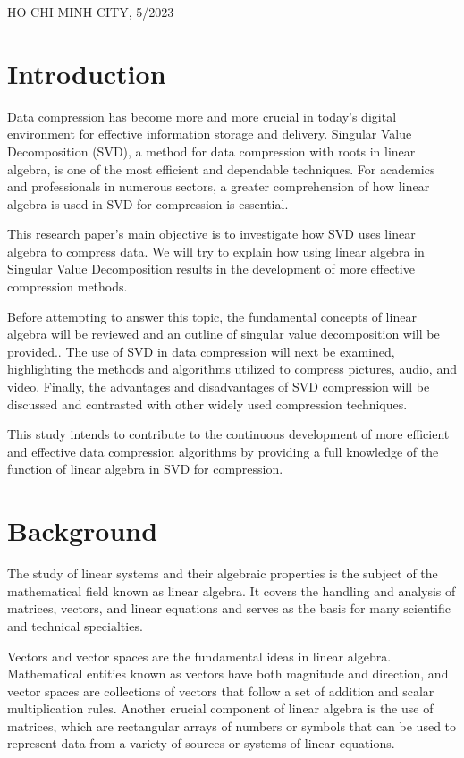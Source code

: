\documentclass[a4paper]{article}
\begin{document}
{\begin{titlepage}
			\begin{center}
				{\footnotesize HO CHI MINH CITY, 5/2023}
			\end{center}
		\end{titlepage}
		
		
		
		
		\newpage
		\tableofcontents
		\newpage
		\section{Introduction} 
		Data compression has become more and more crucial in today's digital environment for effective information storage and delivery. Singular Value Decomposition (SVD), a method for data compression with roots in linear algebra, is one of the most efficient and dependable techniques. For academics and professionals in numerous sectors, a greater comprehension of how linear algebra is used in SVD for compression is essential.
		
		This research paper's main objective is to investigate how SVD uses linear algebra to compress data. We will try to explain how using linear algebra in Singular Value Decomposition results in the development of more effective compression methods.
		
		Before attempting to answer this topic, the fundamental concepts of linear algebra will be reviewed and an outline of singular value decomposition will be provided.. The use of SVD in data compression will next be examined, highlighting the methods and algorithms utilized to compress pictures, audio, and video. Finally, the advantages and disadvantages of SVD compression will be discussed and contrasted with other widely used compression techniques.
		
		
		This study intends to contribute to the continuous development of more efficient and effective data compression algorithms by providing a full knowledge of the function of linear algebra in SVD for compression.
		\newpage
		
		\section{Background}
		The study of linear systems and their algebraic properties is the subject of the mathematical field known as linear algebra. It covers the handling and analysis of matrices, vectors, and linear equations and serves as the basis for many scientific and technical specialties.
		
		Vectors and vector spaces are the fundamental ideas in linear algebra. Mathematical entities known as vectors have both magnitude and direction, and vector spaces are collections of vectors that follow a set of addition and scalar multiplication rules. Another crucial component of linear algebra is the use of matrices, which are rectangular arrays of numbers or symbols that can be used to represent data from a variety of sources or systems of linear equations.
		
}
\end{document}
